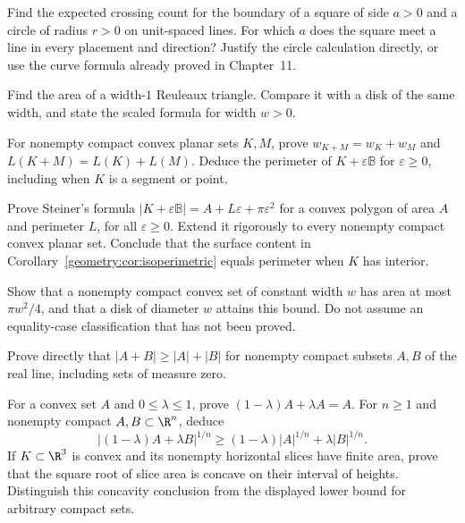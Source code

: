 \begin{exercise}[$\star$]\label{geometry:ex:noodle}
Find the expected crossing count for the boundary of a square of side $a>0$ and a circle of radius $r>0$ on unit-spaced lines. For which $a$ does the square meet a line in every placement and direction? Justify the circle calculation directly, or use the curve formula already proved in Chapter~11.
\end{exercise}

\begin{exercise}[$\star$]\label{geometry:ex:reuleauxarea}
Find the area of a width-$1$ Reuleaux triangle. Compare it with a disk of the same width, and state the scaled formula for width $w>0$.
\end{exercise}

\begin{exercise}[$\star\star$]\label{geometry:ex:minkowskiwidth}
For nonempty compact convex planar sets $K,M$, prove $w_{K+M}=w_K+w_M$ and $L(K+M)=L(K)+L(M)$. Deduce the perimeter of $K+\varepsilon\mathbb B$ for $\varepsilon\ge0$, including when $K$ is a segment or point.
\end{exercise}

\begin{exercise}[$\star\star$]\label{geometry:ex:steiner}
Prove Steiner's formula $|K+\varepsilon\mathbb B|=A+L\varepsilon+\pi\varepsilon^2$ for a convex polygon of area $A$ and perimeter $L$, for all $\varepsilon\ge0$. Extend it rigorously to every nonempty compact convex planar set. Conclude that the surface content in Corollary~\ref{geometry:cor:isoperimetric} equals perimeter when $K$ has interior.
\end{exercise}

\begin{exercise}[$\star\star$]\label{geometry:ex:constwidthdisk}
Show that a nonempty compact convex set of constant width $w$ has area at most $\pi w^2/4$, and that a disk of diameter $w$ attains this bound. Do not assume an equality-case classification that has not been proved.
\end{exercise}

\begin{exercise}[$\star$]\label{geometry:ex:bmone}
Prove directly that $|A+B|\ge|A|+|B|$ for nonempty compact subsets $A,B$ of the real line, including sets of measure zero.
\end{exercise}

\begin{exercise}[$\star\star$]\label{geometry:ex:bmconcave}
For a convex set $A$ and $0\le\lambda\le1$, prove $(1-\lambda)A+\lambda A=A$. For $n\ge1$ and nonempty compact $A,B\subset\R^n$, deduce
\[
|(1-\lambda)A+\lambda B|^{1/n}
\ge(1-\lambda)|A|^{1/n}+\lambda|B|^{1/n}.
\]
If $K\subset\R^3$ is convex and its nonempty horizontal slices have finite area, prove that the square root of slice area is concave on their interval of heights. Distinguish this concavity conclusion from the displayed lower bound for arbitrary compact sets.
\end{exercise}

